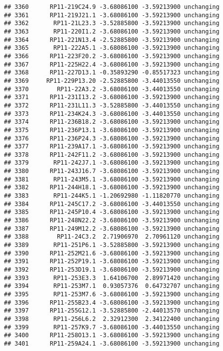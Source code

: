 \documentclass[]{article}
\begin{document}
\begin{verbatim}
## 3360      RP11-219C24.9 -3.68086100 -3.59213900 unchanging
## 3361      RP11-219J21.1 -3.68086100 -3.59213900 unchanging
## 3362       RP11-21L23.3 -3.52885800 -3.59213900 unchanging
## 3363       RP11-220I1.2 -3.68086100 -3.59213900 unchanging
## 3364      RP11-221N13.4 -2.52885800 -3.59213900 unchanging
## 3365       RP11-222A5.1 -3.68086100 -3.59213900 unchanging
## 3366      RP11-223F20.2 -3.68086100 -3.59213900 unchanging
## 3367      RP11-225H22.4 -3.68086100 -3.59213900 unchanging
## 3368      RP11-227D13.1 -0.35893290 -0.85517323 unchanging
## 3369     RP11-229P13.20 -2.52885800 -3.44013550 unchanging
## 3370        RP11-22A3.2 -3.68086100 -3.44013550 unchanging
## 3371      RP11-231I13.2 -3.68086100 -3.59213900 unchanging
## 3372      RP11-231L11.3 -3.52885800 -3.44013550 unchanging
## 3373      RP11-234K24.3 -3.68086100 -3.44013550 unchanging
## 3374      RP11-236B18.2 -3.68086100 -3.59213900 unchanging
## 3375      RP11-236P13.1 -3.68086100 -3.59213900 unchanging
## 3376      RP11-236P24.3 -3.68086100 -3.59213900 unchanging
## 3377      RP11-239A17.1 -3.68086100 -3.59213900 unchanging
## 3378      RP11-242F11.2 -3.68086100 -3.59213900 unchanging
## 3379       RP11-242J7.1 -3.68086100 -3.59213900 unchanging
## 3380      RP11-243J16.7 -3.68086100 -3.59213900 unchanging
## 3381       RP11-243M5.1 -3.68086100 -3.59213900 unchanging
## 3382      RP11-244H18.1 -3.68086100 -3.59213900 unchanging
## 3383       RP11-244K5.1 -1.20692980 -1.11820770 unchanging
## 3384      RP11-245C17.2 -3.68086100 -3.44013550 unchanging
## 3385      RP11-245P10.4 -3.68086100 -3.59213900 unchanging
## 3386      RP11-248N22.2 -3.68086100 -3.59213900 unchanging
## 3387      RP11-249M12.2 -3.68086100 -3.59213900 unchanging
## 3388        RP11-24C3.2  2.71906970  2.70961120 unchanging
## 3389       RP11-251P6.1 -3.52885800 -3.59213900 unchanging
## 3390      RP11-252M21.6 -3.68086100 -3.59213900 unchanging
## 3391      RP11-252P19.1 -3.68086100 -3.59213900 unchanging
## 3392      RP11-253D19.1 -3.68086100 -3.59213900 unchanging
## 3393       RP11-253E3.3  1.64106700  2.89971420 unchanging
## 3394       RP11-253M7.1  0.93057376  0.64732707 unchanging
## 3395       RP11-253M7.6 -3.68086100 -3.59213900 unchanging
## 3396      RP11-255B23.4 -3.68086100 -3.59213900 unchanging
## 3397      RP11-255G12.1 -3.52885800 -2.44013570 unchanging
## 3398       RP11-256L6.2  2.32912300  2.34122400 unchanging
## 3399       RP11-257K9.7 -3.68086100 -3.44013550 unchanging
## 3400      RP11-258O13.1 -3.68086100 -3.59213900 unchanging
## 3401      RP11-259A24.1 -3.68086100 -3.59213900 unchanging

\end{verbatim}
\end{document}
